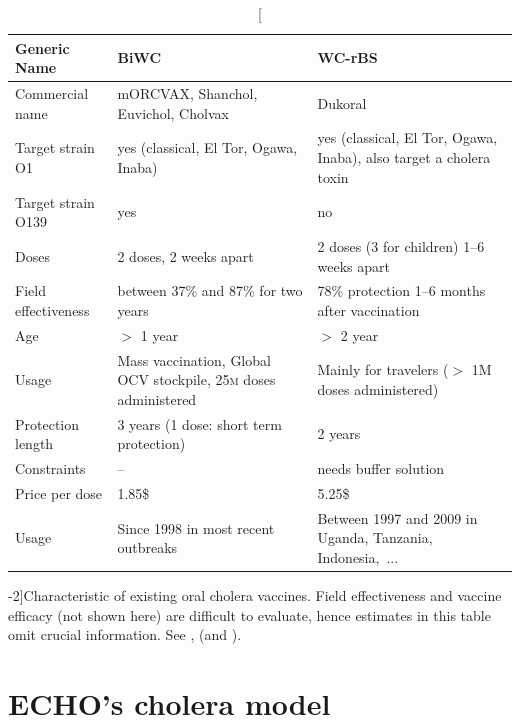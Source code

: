  \begin{table}[h]
\centering\small
\label{tab:prior}
\begin{tabular}{lp{40mm}p{40mm}}
\toprule
Generic Name &  BiWC & WC-rBS\\ 
\midrule
Commercial name   &  mORCVAX, Shanchol,  Euvichol, Cholvax & Dukoral  \\
Target strain O1 &   yes (classical, El Tor, Ogawa, Inaba)& yes (classical, El Tor, Ogawa, Inaba), also target a cholera toxin  \\
Target strain O139   &  yes &      no     \\
Doses   &  2 doses, 2 weeks apart & 2 doses (3 for children) 1--6 weeks apart  \\
Field effectiveness  & between 37\% and 87\% for two years & 78\% protection 1--6 months after vaccination\\
Age   &  $>$ 1 year & $>$ 2 year      \\
Usage & Mass vaccination, Global OCV stockpile, 25\textsc{m} doses administered & Mainly for travelers ($>$ 1M doses administered)\\
Protection length & 3 years (1 dose: short term protection) & 2 years\\
Constraints & -- & needs buffer solution\\
Price per dose & 1.85\$ & 5.25\$ \\ 
Usage & Since 1998 in most recent outbreaks & Between 1997 and 2009 in Uganda, Tanzania, Indonesia,~... \\
\bottomrule
\end{tabular}
\caption[Characteristic of existing oral cholera vaccines][-2\baselineskip]{Characteristic of existing oral cholera vaccines. Field effectiveness and vaccine efficacy (not shown here) are difficult to evaluate, hence estimates in this table omit crucial information. See ,  (and ).}%
\label{tab:vacc}
\end{table}

\section{ECHO's cholera model}

